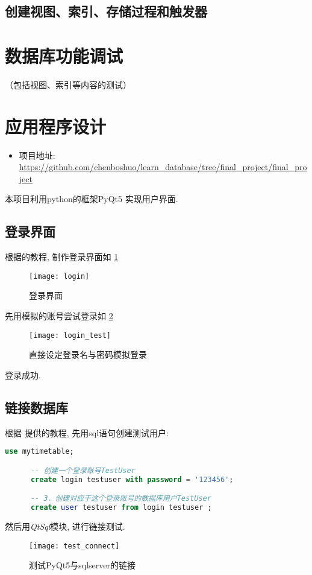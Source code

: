\documentclass{myreport}
\begin{document}
  \subsection{创建视图、索引、存储过程和触发器}


\section{数据库功能调试}
（包括视图、索引等内容的测试）

\section{应用程序设计}
  \begin{itemize}
    \item 项目地址:
    \url{https://github.com/chenboshuo/learn_database/tree/final_project/final_project}
  \end{itemize}
  本项目利用python的框架PyQt5  实现用户界面.

  \subsection{登录界面}
    根据\cite{pyqt5_login}的教程, 制作登录界面如
    \cref{fig:login}

    \begin{figure}[H]
      \centering
      \texttt{[image: login]}
      \caption{登录界面}
      \label{fig:login}
    \end{figure}
    先用模拟的账号尝试登录如
    \cref{fig:login_test}
    \begin{figure}[H]
      \centering
      \texttt{[image: login\_test]}
      \caption{直接设定登录名与密码模拟登录}
      \label{fig:login_test}
    \end{figure}
    登录成功.
  \subsection{链接数据库}
    根据 \cite{connect_database} 提供的教程, 先用sql语句创建测试用户:
    \begin{lstlisting}[language=sql]
      use mytimetable;

      -- 创建一个登录账号TestUser
      create login testuser with password = '123456';

      -- 3．创建对应于这个登录账号的数据库用户TestUser
      create user testuser from login testuser ;
    \end{lstlisting}
    然后用\emph{QtSql}模块, 进行链接测试.
    \begin{figure}[H]
      \centering
      \texttt{[image: test\_connect]}
      \caption{测试PyQt5与sqlserver的链接}
      \label{fig:test_connect}
    \end{figure}
\end{document}
